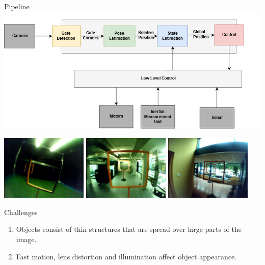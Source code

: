 \documentclass{beamer}
\begin{document}
\begin{darkframes}
\begin{frame}{Pipeline}
\includegraphics[width=\textwidth]{fig/control_loop_inv}
\end{frame}
\begin{frame}
\centering
\includegraphics[width=0.31\textwidth]{../../thesis/fig/real_cyberzoo1.png}
\includegraphics[width=0.31\textwidth]{../../thesis/fig/basement}
\includegraphics[width=0.31\textwidth]{../../thesis/fig/hallway}
\begin{block}{Challenges}
	\begin{enumerate}
		\item Objects consist of thin structures that are spread over large parts of the image.
		
		\item Fast motion, lens distortion and illumination affect object appearance.
		

\end{enumerate}
\end{block}
\end{frame}
\end{darkframes}
\end{document}
